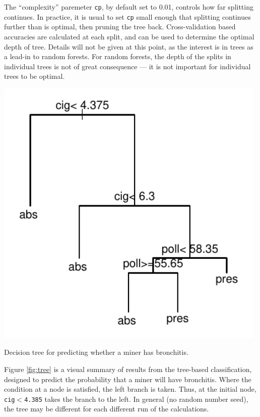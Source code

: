\documentclass{tufte-book}\usepackage[]{graphicx}\usepackage[]{color}
\newcommand{\txtt}[1]{\texttt{#1}}
\begin{document}
The ``complexity'' paremeter \txtt{cp}, by default set to 0.01,
controls how far splitting continues.  In practice, it is usual to
set \txtt{cp} small enough that splitting continues further than
is optimal, then pruning the tree back. Cross-validation based
accuracies are calculated at each split, and can be used to determine
the optimal depth of tree.  Details will not be given at this point,
as the interest is in trees as a lead-in to random forests.  For
random forests, the depth of the splits in individual trees is not
of great consequence --- it is not important for individual trees
to be optimal.

\begin{marginfigure}
\begin{Schunk}


\centerline{\includegraphics[width=0.98\textwidth]{figs/12-treefig-1} }

\end{Schunk}
\caption{Decision tree for predicting whether a miner has
    bronchitis.
}\label{fig:tree}
\end{marginfigure}

Figure \ref{fig:tree} is a visual summary of results from the
tree-based classification, designed to predict the probability that a
miner will have bronchitis.  Where the condition at a node is
satisfied, the left branch is taken. Thus, at the initial node,
\txtt{cig$<$4.385} takes the branch to the left.  In general (no
random number seed), the tree may be different for each
different run of the calculations.
\end{document}
